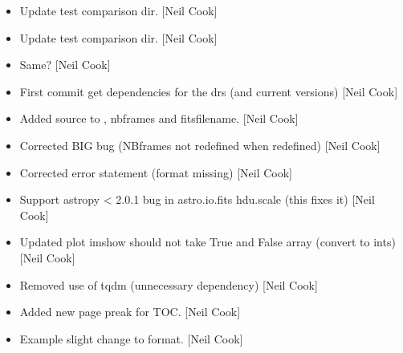 \documentclass[a4paper,10pt,english]{report}
\begin{document}
\begin{itemize}
\item {} 
Update test comparison dir. {[}Neil Cook{]}

\item {} 
Update test comparison dir. {[}Neil Cook{]}

\item {} 
Same? {[}Neil Cook{]}

\item {} 
First commit \sphinxhyphen{} get dependencies for the drs (and current versions)
{[}Neil Cook{]}

\item {} 
Added source to , nbframes and fitsfilename. {[}Neil Cook{]}

\item {} 
Corrected BIG bug (NBframes not redefined when 
redefined) {[}Neil Cook{]}

\item {} 
Corrected error statement (format missing) {[}Neil Cook{]}

\item {} 
Support astropy \textless{} 2.0.1 bug in astro.io.fits hdu.scale (this fixes it)
{[}Neil Cook{]}

\item {} 
Updated plot imshow should not take True and False array (convert to
ints) {[}Neil Cook{]}

\item {} 
Removed use of tqdm (unnecessary dependency) {[}Neil Cook{]}

\item {} 
Added new page preak for TOC. {[}Neil Cook{]}

\item {} 
Example \sphinxhyphen{} slight change to format. {[}Neil Cook{]}

\end{itemize}
\end{document}
